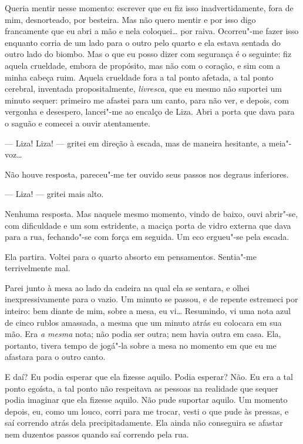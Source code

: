 Queria mentir nesse momento: escrever que eu fiz isso inadvertidamente,
fora de mim, desnorteado, por besteira. Mas não quero mentir e por isso
digo francamente que eu abri a mão e nela coloquei\ldots{} por raiva.
Ocorreu"-me fazer isso enquanto corria de um lado para o outro pelo
quarto e ela estava sentada do outro lado do biombo. Mas o que eu posso
dizer com segurança é o seguinte: fiz aquela crueldade, embora de
propósito, mas não com o coração, e sim com a minha cabeça ruim. Aquela
crueldade fora a tal ponto afetada, a tal ponto cerebral, inventada
propositalmente, \textit{livresca}, que eu mesmo não suportei um minuto
sequer: primeiro me afastei para um canto, para não ver, e depois, com
vergonha e desespero, lancei"-me ao encalço de Liza. Abri a porta que
dava para o saguão e comecei a ouvir atentamente.

--- Liza! Liza! --- gritei em direção à escada, mas de maneira hesitante, a
meia"-voz\ldots{}

Não houve resposta, pareceu"-me ter ouvido seus passos nos degraus
inferiores.

--- Liza! --- gritei mais alto.

Nenhuma resposta. Mas naquele mesmo momento, vindo de baixo, ouvi
abrir"-se, com dificuldade e um som estridente, a maciça porta de vidro
externa que dava para a rua, fechando"-se com força em seguida. Um eco
ergueu"-se pela escada.

Ela partira. Voltei para o quarto absorto em pensamentos. Sentia"-me
terrivelmente mal.

Parei junto à mesa ao lado da cadeira na qual ela se sentara, e olhei
inexpressivamente para o vazio. Um minuto se passou, e de repente estremeci por
inteiro: bem diante de mim, sobre a mesa, eu vi\ldots{} Resumindo, vi uma nota
azul de cinco rublos amassada, a mesma que um minuto atrás eu colocara em sua
mão. Era \textit{a mesma} nota; não podia ser outra; nem havia outra em casa.
Ela, portanto, tivera tempo de jogá"-la sobre a mesa no momento em que eu me
afastara para o outro canto.

E daí? Eu podia esperar que ela fizesse aquilo. Podia esperar? Não. Eu
era a tal ponto egoísta, a tal ponto não respeitava as pessoas na
realidade que sequer podia imaginar que ela fizesse aquilo. Não pude
suportar aquilo. Um momento depois, eu, como um louco, corri para me
trocar, vesti o que pude às pressas, e saí correndo atrás dela
precipitadamente. Ela ainda não conseguira se afastar nem duzentos
passos quando saí correndo pela rua.


